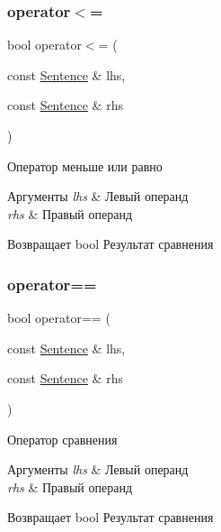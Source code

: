 \subsubsection{\texorpdfstring{operator$<$=}{operator<=}}
{\footnotesize\ttfamily bool operator$<$= (\begin{DoxyParamCaption}\item[{const \hyperlink{classJarvis_1_1Sentence}{Sentence} \&}]{lhs,  }\item[{const \hyperlink{classJarvis_1_1Sentence}{Sentence} \&}]{rhs }\end{DoxyParamCaption})\hspace{0.3cm}{\ttfamily [friend]}}



Оператор меньше или равно 


\begin{DoxyParams}{Аргументы}
{\em lhs} & Левый операнд \\
\hline
{\em rhs} & Правый операнд \\
\hline
\end{DoxyParams}
\begin{DoxyReturn}{Возвращает}
bool Результат сравнения 
\end{DoxyReturn}
\mbox{\label{classJarvis_1_1Sentence_a6ecb6a1aa4a36b15b8871048ec240467}} 
\subsubsection{\texorpdfstring{operator==}{operator==}}
{\footnotesize\ttfamily bool operator== (\begin{DoxyParamCaption}\item[{const \hyperlink{classJarvis_1_1Sentence}{Sentence} \&}]{lhs,  }\item[{const \hyperlink{classJarvis_1_1Sentence}{Sentence} \&}]{rhs }\end{DoxyParamCaption})\hspace{0.3cm}{\ttfamily [friend]}}



Оператор сравнения 


\begin{DoxyParams}{Аргументы}
{\em lhs} & Левый операнд \\
\hline
{\em rhs} & Правый операнд \\
\hline
\end{DoxyParams}
\begin{DoxyReturn}{Возвращает}
bool Результат сравнения 
\end{DoxyReturn}
\mbox{\label{classJarvis_1_1Sentence_a90cda2640b9dadd4b19c9baae07fe55d}} 
